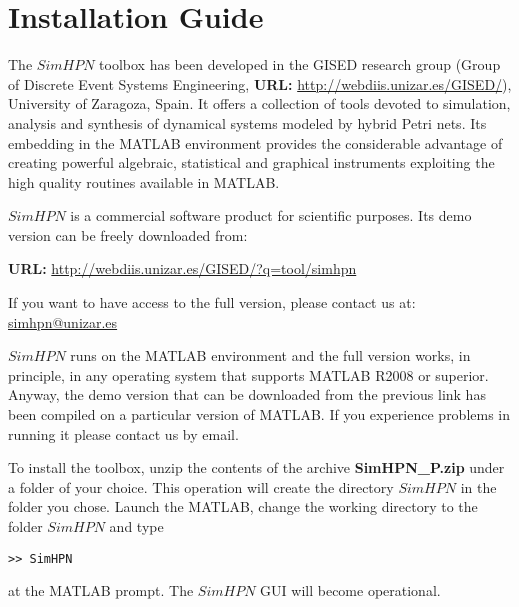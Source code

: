 

\chapter{Installation Guide}

The $SimHPN$ toolbox has been developed in the GISED research group (Group of Discrete Event Systems Engineering, \textbf{URL:} \url{http://webdiis.unizar.es/GISED/}), University of Zaragoza, Spain.  It offers a collection of tools devoted to simulation, analysis and synthesis of dynamical systems modeled by hybrid Petri nets. Its embedding in the 
MATLAB environment provides the considerable advantage  of creating powerful algebraic, statistical and graphical 
instruments exploiting the high quality routines available in MATLAB.

$SimHPN$ is a commercial software product for scientific purposes. Its demo version can be freely downloaded from: 

\textbf{URL:} \url{http://webdiis.unizar.es/GISED/?q=tool/simhpn}

If you want to have access to the full version, please contact us at: \url{simhpn@unizar.es}

$SimHPN$ runs on the MATLAB environment and the full version works, in principle, in any operating system that supports MATLAB R2008 or superior. Anyway, the demo version that can be downloaded from the previous link has been compiled on a particular version of MATLAB. If you experience problems in running it please contact us by email.

To install the toolbox, unzip the contents of the archive \textbf{SimHPN\_P.zip} under a folder of your choice. This operation will create the directory $SimHPN$ in the folder you chose. Launch the MATLAB, change the working directory to the folder $SimHPN$ and type 

\texttt{>> SimHPN}

at the MATLAB prompt. The $SimHPN$ GUI will become operational.


\newpage
